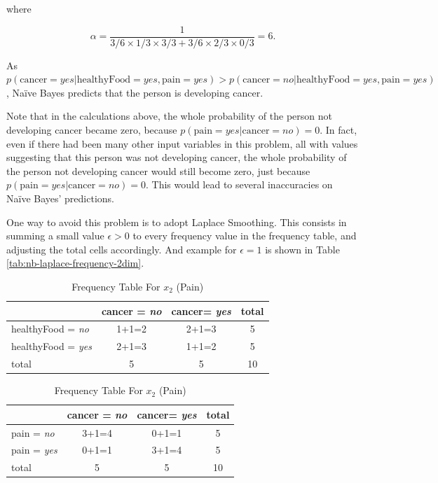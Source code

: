 \noindent where 

\[\alpha = \frac{1}{3/6 \times 1/3 \times 3/3 + 3/6 \times 2/3 \times 0/3} = 6. \]

\vspace{0.5cm}
As $p(\text{cancer} = \textit{yes}| \text{healthyFood} = \textit{yes}, \text{pain} = \textit{yes})  > p(\text{cancer} = \textit{no}| \text{healthyFood} = \textit{yes}, \text{pain} = \textit{yes})$, Na\"{i}ve Bayes predicts that the person is developing cancer.

Note that in the calculations above, the whole probability of the person not developing cancer became zero, because $p(\text{pain} = \textit{yes} | \text{cancer} = \textit{no}) = 0$. In fact, even if there had been many other input variables in this problem, all with values suggesting that this person was not developing cancer, the whole probability of the person not developing cancer would still become zero, just because $p(\text{pain} = yes | \text{cancer} = \textit{no}) = 0$. This would lead to several inaccuracies on Na\"{i}ve Bayes' predictions. 

One way to avoid this problem is to adopt Laplace Smoothing. This consists in summing a small value $\epsilon > 0$ to every frequency value in the frequency table, and adjusting the total cells accordingly. And example for $\epsilon = 1$  is shown in Table \ref{tab:nb-laplace-frequency-2dim}.

\begin{table}[ht]
\centering
\caption{An Illustrative Frequency Table With Laplace Smoothing For The Two Input Variable Dataset From Table \ref{tab:dataset-2dim}} \label{tab:nb-laplace-frequency-2dim}
\begin{subtable}[h]{0.49\textwidth}
\caption{Frequency Table For $x_1$ (healthyFood)} \label{tab:nb-laplace-frequency-2dim-healthy}
\begin{tabular}{|l|c|c|c|} \hline
 & cancer = \textit{no} & cancer= \textit{yes} & total \\ \hline
healthyFood = \textit{no} & 1+1=2 & 2+1=3 & 5 \\ \hline
healthyFood = \textit{yes} & 2+1=3 & 1+1=2 & 5 \\ \hline
total & 5 & 5 & 10 \\ \hline
\end{tabular}
\end{subtable}
\vspace{0.5cm}

\begin{subtable}[h]{0.49\textwidth}
\caption{Frequency Table For $x_2$ (Pain)}
\begin{tabular}{|l|c|c|c|} \hline
 & cancer = \textit{no} & cancer= \textit{yes} & total \\ \hline
pain = \textit{no} & 3+1=4 & 0+1=1 & 5 \\ \hline
pain = \textit{yes} & 0+1=1 & 3+1=4 & 5 \\ \hline
total & 5 & 5 & 10 \\ \hline
\end{tabular}
\end{subtable}
\end{table}

